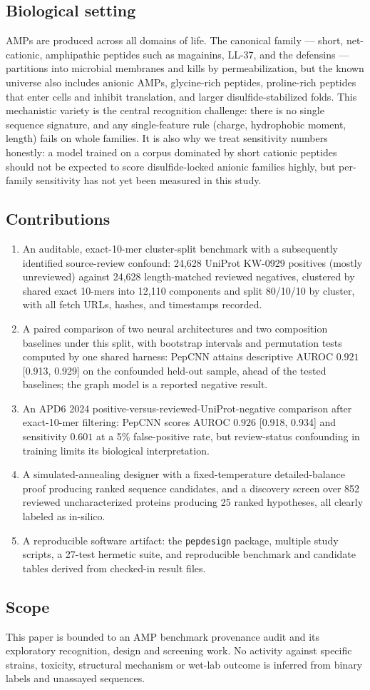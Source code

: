 \subsection{Biological setting}
AMPs are produced across all domains of life. The canonical family --- short,
net-cationic, amphipathic peptides such as magainins, LL-37, and the
defensins --- partitions into microbial membranes and kills by
permeabilization, but the known universe also includes anionic AMPs,
glycine-rich peptides, proline-rich peptides that enter cells and inhibit
translation, and larger disulfide-stabilized folds. This mechanistic variety
is the central recognition challenge: there is no single sequence signature,
and any single-feature rule (charge, hydrophobic moment, length) fails on
whole families. It is also why we treat sensitivity numbers honestly: a model
trained on a corpus dominated by short cationic peptides should not be
expected to score disulfide-locked anionic families highly, but per-family sensitivity has not yet been measured in this study.

\subsection{Contributions}
\begin{enumerate}
\item An auditable, exact-10-mer cluster-split benchmark with a subsequently
identified source-review confound:
24{,}628 UniProt KW-0929 positives (mostly unreviewed) against 24{,}628 length-matched
reviewed negatives, clustered by shared exact 10-mers into 12{,}110
components and split 80/10/10 by cluster, with all fetch URLs, hashes, and
timestamps recorded.
\item A paired comparison of two neural architectures and two composition
baselines under this split, with bootstrap intervals and permutation tests
computed by one shared harness: PepCNN attains descriptive AUROC $0.921$ [0.913, 0.929] on the confounded
held-out sample, ahead of the tested baselines; the graph model is a reported negative
result.
\item An APD6 2024 positive-versus-reviewed-UniProt-negative comparison after exact-10-mer filtering:
PepCNN scores AUROC $0.926$ [0.918, 0.934] and sensitivity $0.601$ at a
5\% false-positive rate, but review-status confounding in training limits
its biological interpretation.
\item A simulated-annealing designer with a fixed-temperature detailed-balance
proof producing ranked sequence candidates, and a discovery
screen over 852 reviewed uncharacterized proteins producing 25 ranked
hypotheses, all clearly labeled as in-silico.
\item A reproducible software artifact: the \texttt{pepdesign} package, multiple study scripts, a 27-test hermetic suite, and reproducible
benchmark and candidate tables derived from checked-in result files.
\end{enumerate}

\subsection{Scope}
This paper is bounded to an AMP benchmark provenance audit and its exploratory recognition, design and screening work. No activity against specific strains, toxicity, structural mechanism or wet-lab outcome is inferred from binary labels and unassayed sequences.
